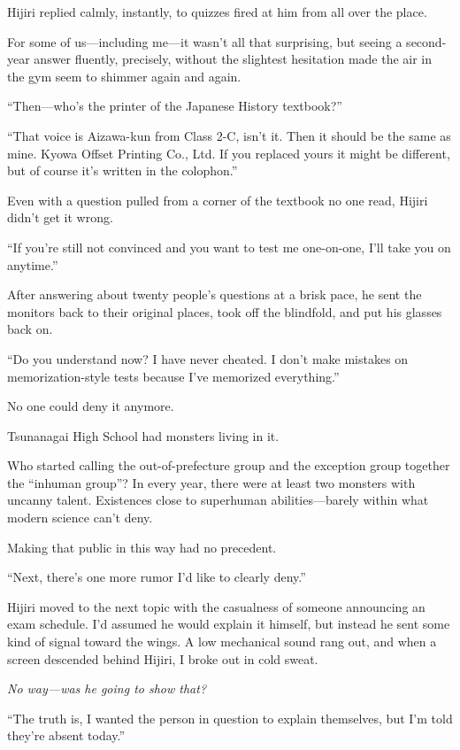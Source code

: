 \documentclass[
    a4paper,
    12pt,
    twoside,
    openany,
    UTF8,
    fontset=windows
]{ctexbook}
\begin{document}
Hijiri replied calmly, instantly, to quizzes fired at him from all over the place.

For some of us---including me---it wasn't all that surprising, but seeing a second-year answer fluently, precisely, without the slightest hesitation made the air in the gym seem to shimmer again and again.

``Then---who's the printer of the Japanese History textbook?''

``That voice is Aizawa-kun from Class 2-C, isn't it. Then it should be the same as mine. Kyowa Offset Printing Co., Ltd. If you replaced yours it might be different, but of course it's written in the colophon.''

Even with a question pulled from a corner of the textbook no one read, Hijiri didn't get it wrong.

``If you're still not convinced and you want to test me one-on-one, I'll take you on anytime.''

After answering about twenty people's questions at a brisk pace, he sent the monitors back to their original places, took off the blindfold, and put his glasses back on.

``Do you understand now? I have never cheated. I don't make mistakes on memorization-style tests because I've memorized everything.''

No one could deny it anymore.

Tsunanagai High School had monsters living in it.

Who started calling the out-of-prefecture group and the exception group together the ``inhuman group''? In every year, there were at least two monsters with uncanny talent. Existences close to superhuman abilities---barely within what modern science can't deny.

Making that public in this way had no precedent.

``Next, there's one more rumor I'd like to clearly deny.''

Hijiri moved to the next topic with the casualness of someone announcing an exam schedule. I'd assumed he would explain it himself, but instead he sent some kind of signal toward the wings. A low mechanical sound rang out, and when a screen descended behind Hijiri, I broke out in cold sweat.

\textit{No way---was he going to show that?}

``The truth is, I wanted the person in question to explain themselves, but I'm told they're absent today.''
\end{document}
